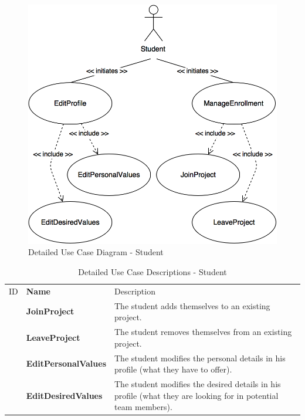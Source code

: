\documentclass[12pt,letterpaper]{article}
\begin{document}
\begin{figure}[H]
	\centering{}
	\includegraphics[scale=0.3]{imgs/detailed-student-use-case-diagram.png}
	\caption{Detailed Use Case Diagram - Student}
\end{figure}

\begin{table}[H]
	\caption{Detailed Use Case Descriptions - Student}
	\vspace{1em}
	\begin{tabu} to 
	    \tableheader{}ID & Name & Description\\
		\joinproject{} & JoinProject & The student adds themselves to an existing project.\\
		\leaveproject{} & LeaveProject & The student removes themselves from an existing project.\\
		\editpersonalvalues{} & EditPersonalValues & The student modifies the personal details in his profile (what they have to offer).\\
		\editdesiredvalues{} & EditDesiredValues & The student modifies the desired details in his profile (what they are looking for in potential team members).\\
	\end{tabu}
\end{table}
\end{document}
